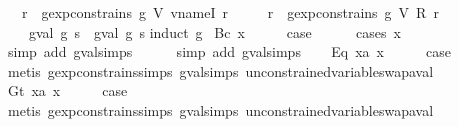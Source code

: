 \begin{isabellebody}
\ \ \ {\isachardoublequoteopen}{\isasymforall}r{\isachardot}\ {\isasymnot}\ gexp{\isacharunderscore}constrains\ g\ {\isacharparenleft}V\ {\isacharparenleft}vname{\isachardot}I\ r{\isacharparenright}{\isacharparenright}\ {\isasymLongrightarrow}\isanewline
\ \ \ \ {\isasymforall}r{\isachardot}\ {\isasymnot}\ gexp{\isacharunderscore}constrains\ g\ {\isacharparenleft}V\ {\isacharparenleft}R\ r{\isacharparenright}{\isacharparenright}\ {\isasymLongrightarrow}\isanewline
\ \ \ \ gval\ g\ s\ {\isacharequal}\ gval\ g\ s{\isacharprime}{\isachardoublequoteclose}\isanewline
%
\isadelimproof
%
\endisadelimproof
%
\isatagproof
{}\isamarkupfalse%
{\isacharparenleft}induct\ g{\isacharparenright}\isanewline
{}\isamarkupfalse%
\ {\isacharparenleft}Bc\ x{\isacharparenright}\isanewline
\ \ \isamarkupfalse%
\ \isamarkupfalse%
\ {\isacharquery}case\isanewline
\ \ \ \ \isamarkupfalse%
\ {\isacharparenleft}cases\ x{\isacharparenright}\isanewline
\ \ \ \ \ \isamarkupfalse%
\ {\isacharparenleft}simp\ add{\isacharcolon}\ gval{\isachardot}simps{\isacharparenleft}{}{\isacharparenright}{\isacharparenright}\isanewline
\ \ \ \ \isamarkupfalse%
\ {\isacharparenleft}simp\ add{\isacharcolon}\ gval{\isachardot}simps{\isacharparenleft}{}{\isacharparenright}{\isacharparenright}\isanewline
{}\isamarkupfalse%
\isanewline
\ \ \isamarkupfalse%
\ {\isacharparenleft}Eq\ x{}a\ x{}{\isacharparenright}\isanewline
\ \ \isamarkupfalse%
\ \isamarkupfalse%
\ {\isacharquery}case\isanewline
\ \ \ \ \isamarkupfalse%
\ {\isacharparenleft}metis\ gexp{\isacharunderscore}constrains{\isachardot}simps{\isacharparenleft}{}{\isacharparenright}\ gval{\isachardot}simps{\isacharparenleft}{}{\isacharparenright}\ unconstrained{\isacharunderscore}variable{\isacharunderscore}swap{\isacharunderscore}aval{\isacharparenright}\isanewline
{}\isamarkupfalse%
\isanewline
\ \ \isamarkupfalse%
\ {\isacharparenleft}Gt\ x{}a\ x{}{\isacharparenright}\isanewline
\ \ \isamarkupfalse%
\ \isamarkupfalse%
\ {\isacharquery}case\isanewline
\ \ \ \ \isamarkupfalse%
\ {\isacharparenleft}metis\ gexp{\isacharunderscore}constrains{\isachardot}simps{\isacharparenleft}{}{\isacharparenright}\ gval{\isachardot}simps{\isacharparenleft}{}{\isacharparenright}\ unconstrained{\isacharunderscore}variable{\isacharunderscore}swap{\isacharunderscore}aval{\isacharparenright}\isanewline

\end{isabellebody}
